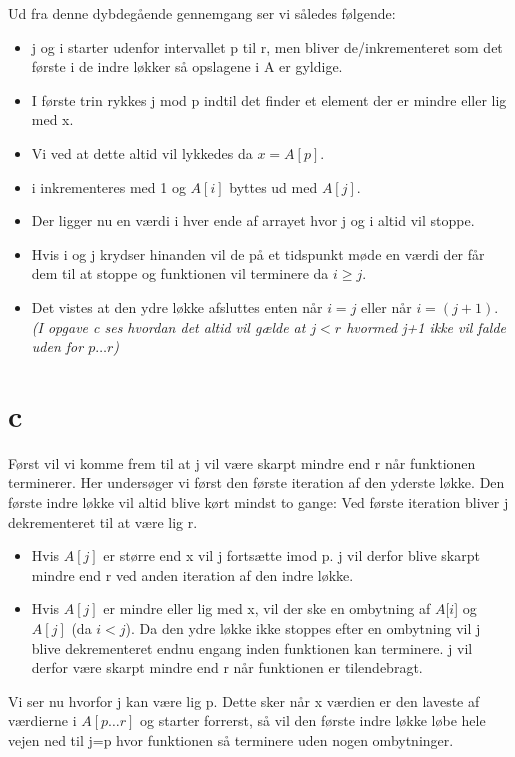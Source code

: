 \documentclass[10pt,a4paper,danish]{article}
\begin{document}
Ud fra denne dybdegående gennemgang ser vi således følgende:
\begin{itemize}
\item j og i starter udenfor intervallet p til r, men bliver de/inkrementeret som det første i de indre løkker så opslagene i A er gyldige.
\item I første trin rykkes j mod p indtil det finder et element der er mindre eller lig med x.
\item Vi ved at dette altid vil lykkedes da $x = A[p]$.
\item i inkrementeres med 1 og $A[i]$ byttes ud med $A[j]$. 
\item Der ligger nu en værdi i hver ende af arrayet hvor j og i altid vil stoppe.
\item Hvis i og j krydser hinanden vil de på et tidspunkt møde en værdi der får dem til at stoppe og funktionen vil terminere da $i \geq j$. 
\\

\item Det vistes at den ydre løkke afsluttes enten når $i=j$ eller når $i=(j + 1)$.\\
\textit{(I opgave c ses hvordan det altid vil gælde at $j < r$ hvormed j+1 ikke vil falde uden for $p \ldots r$)}
\end{itemize}


\section{c}
Først vil vi komme frem til at j vil være skarpt mindre end r når funktionen terminerer.
Her undersøger vi først den første iteration af den yderste løkke.
Den første indre løkke vil altid blive kørt mindst to gange: Ved første iteration bliver j dekrementeret til at være lig r. 
\begin{itemize}
\item Hvis $A[j]$ er større end x vil j fortsætte imod p. j vil derfor blive skarpt mindre end r ved anden iteration af den indre løkke.
\item Hvis $A[j]$ er mindre eller lig med x, vil der ske en ombytning af $A[i$] og $A[j]$ (da $i < j$). Da den ydre løkke ikke stoppes efter en ombytning vil j blive dekrementeret endnu engang inden funktionen kan terminere. j vil derfor være skarpt mindre end r når funktionen er tilendebragt. 
\end{itemize}

Vi ser nu hvorfor j kan være lig p.
Dette sker når x værdien er den laveste af værdierne i $A[p \ldots r]$ og starter forrerst, så vil den første indre løkke løbe hele vejen ned til j=p hvor funktionen så terminere uden nogen ombytninger.
\\
\end{document}
